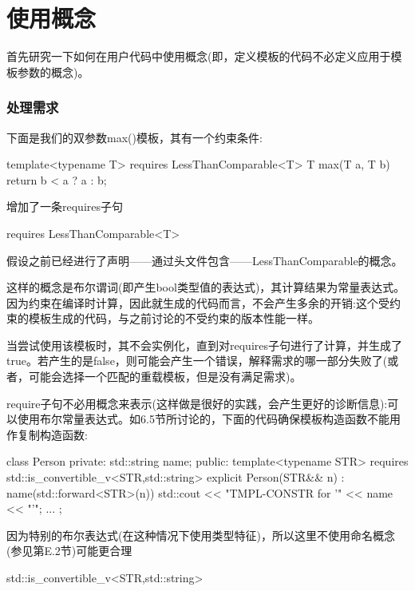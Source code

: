 \section{使用概念}

首先研究一下如何在用户代码中使用概念(即，定义模板的代码不必定义应用于模板参数的概念)。

\subsubsection{处理需求}

下面是我们的双参数max()模板，其有一个约束条件:

\begin{cpp}
template<typename T> requires LessThanComparable<T>
T max(T a, T b) {
	return b < a ? a : b;
}
\end{cpp}

增加了一条requires子句

\begin{cpp}
requires LessThanComparable<T>
\end{cpp}

假设之前已经进行了声明——通过头文件包含——LessThanComparable的概念。

这样的概念是布尔谓词(即产生bool类型值的表达式)，其计算结果为常量表达式。因为约束在编译时计算，因此就生成的代码而言，不会产生多余的开销:这个受约束的模板生成的代码，与之前讨论的不受约束的版本性能一样。

当尝试使用该模板时，其不会实例化，直到对requires子句进行了计算，并生成了true。若产生的是false，则可能会产生一个错误，解释需求的哪一部分失败了(或者，可能会选择一个匹配的重载模板，但是没有满足需求)。

require子句不必用概念来表示(这样做是很好的实践，会产生更好的诊断信息):可以使用布尔常量表达式。如6.5节所讨论的，下面的代码确保模板构造函数不能用作复制构造函数:

\begin{cpp}
class Person
{
	private:
	std::string name;
	public:
	template<typename STR>
	requires std::is_convertible_v<STR,std::string>
	explicit Person(STR&& n)
	: name(std::forward<STR>(n)) {
		std::cout << "TMPL-CONSTR for ’" << name << "’\n";
	}
	...
};
\end{cpp}

因为特别的布尔表达式(在这种情况下使用类型特征)，所以这里不使用命名概念(参见第E.2节)可能更合理

\begin{cpp}
std::is_convertible_v<STR,std::string>
\end{cpp}

